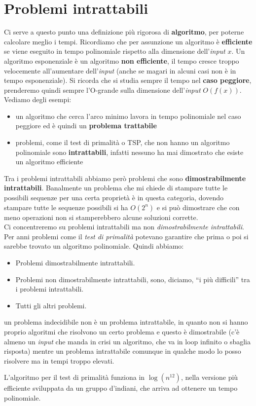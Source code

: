 \section{Problemi intrattabili}
Ci serve a questo punto una definizione più rigorosa di \textbf{algoritmo}, per
poterne calcolare meglio i tempi. Ricordiamo che per assunzione un algoritmo è
\textbf{efficiente} se viene eseguito in tempo polinomiale rispetto alla dimensione
dell'\textit{input} $x$. Un algoritmo esponenziale è un
algoritmo \textbf{non efficiente}, il tempo cresce troppo velocemente
all'aumentare dell'\textit{input} (anche se magari in alcuni casi non è in tempo
esponenziale). Si ricorda che si studia sempre il tempo nel 
\textbf{caso peggiore}, prenderemo quindi sempre l'O-grande sulla dimensione
dell'\textit{input} $O(f(x))$.\\
Vediamo degli esempi:
\begin{itemize}
  \item un algoritmo che cerca l'arco minimo lavora in tempo polinomiale nel
  caso peggiore ed è quindi un \textbf{problema trattabile}
  \item problemi, come il test di primalità o TSP, che non hanno un algoritmo
  polinomiale sono \textbf{intrattabili}, infatti nessuno ha mai dimostrato che
  esiste un algoritmo efficiente
\end{itemize}
Tra i problemi intrattabili abbiamo però problemi che sono
\textbf{dimostrabilmente intrattabili}. Banalmente un problema che mi chiede di
stampare tutte le possibili sequenze per una certa proprietà è in questa
categoria, dovendo stampare tutte le sequenze possibili si ha $O(2^n)$ e si può
dimostrare che con meno operazioni non si stamperebbero alcune soluzioni
corrette.\\
Ci concentreremo su problemi intrattabili ma non \textit{dimostrabilmente
  intrattabili}.\\
Per anni problemi come il \textit{test di primalità} potevano garantire che
prima o poi si sarebbe trovato un algoritmo polinomiale. Quindi abbiamo:
\begin{itemize}
  \item Problemi dimostrabilmente intrattabili.
  \item Problemi non dimostrabilmente intrattabili, sono, diciamo, ``i più
  difficili'' tra i problemi intrattabili.
  \item Tutti gli altri problemi.
\end{itemize}
\begin{nota}
un problema indecidibile non è un problema intrattabile, in quanto non
si hanno proprio algoritmi che risolvono un certo problema e questo è
dimostrabile (c'è almeno un \textit{input} che manda in crisi un algoritmo, che va in
loop infinito o sbaglia risposta) mentre un problema intrattabile comunque in
qualche modo lo posso risolvere ma in tempi troppo elevati.
\end{nota}
\begin{shaded}
  L'algoritmo per il test di primalità funziona in $\log (n^{12})$, nella
  versione più efficiente sviluppata da un gruppo d'indiani, che arriva ad
  ottenere un tempo polinomiale.
\end{shaded}
